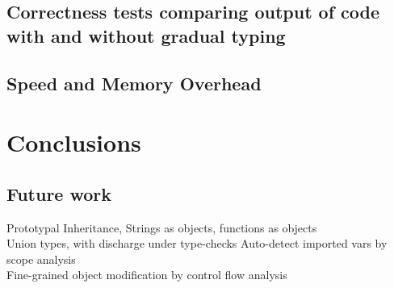 \documentclass[12pt,a4paper,twoside,openright]{report}
\begin{document}
\section{Correctness tests comparing output of code with and without gradual typing}
\section{Speed and Memory Overhead}


\chapter{Conclusions}
\section{Future work}
Prototypal Inheritance, Strings as objects, functions as objects \\
Union types, with discharge under type-checks
Auto-detect imported vars by scope analysis \\
Fine-grained object modification by control flow analysis
\end{document}
